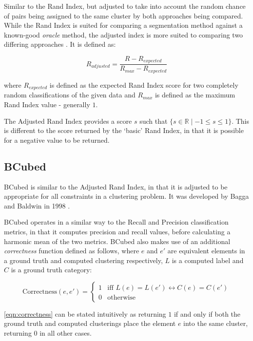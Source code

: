 \documentclass{uvamscse}	%
\begin{document}
Similar to the Rand Index, but adjusted to take into account the random chance of pairs being assigned to the same cluster by both approaches being compared. While the Rand Index is suited for comparing a segmentation method against a known-good \emph{oracle} method, the adjusted index is more suited to comparing two differing approaches \cite{Matteson2012}. It is defined as:
	
	\begin{equation}
	    R_{adjusted} = \frac{R - R_{expected}}{R_{max} - R_{expected}}
	\end{equation}
	
	where $R_{expected}$ is defined as the expected Rand Index score for two completely random classifications of the given data \cite{Matteson2012} and $R_{max}$ is defined as the maximum Rand Index value - generally $1$.
	
	The Adjusted Rand Index provides a score $s$ such that $ \{s\in\mathbb{R} \mid -1\leq s \leq 1\} $. This is different to the score returned by the `basic' Rand Index, in that it is possible for a negative value to be returned.
		
\subsection{BCubed}
		
BCubed is similar to the Adjusted Rand Index, in that it is adjusted to be appropriate for all constraints in a clustering problem. It was developed by Bagga and Baldwin in 1998 \cite{Bagga1998}.
	
	BCubed operates in a similar way to the Recall and Precision classification metrics, in that it computes precision and recall values, before calculating a harmonic mean of the two metrics. BCubed also makes use of an additional \emph{correctness} function defined as follows, where $e$ and $e'$ are equivalent elements in a ground truth and computed clustering respectively, $L$ is a computed label and $C$ is a ground truth category:
	
	\begin{equation}
	\label{eqn:correctness}
	    \text{Correctness}(e,e') = 
	    \begin{cases}
	        1 & \text{iff $L(e) = L(e') \leftrightarrow C(e) = C(e')$}\\
	        0 & \text{otherwise}
	    \end{cases}
	\end{equation}
	
	\autoref{eqn:correctness} can be stated intuitively as returning $1$ if and only if both the ground truth and computed clusterings place the element $e$ into the same cluster, returning $0$ in all other cases.
	
\end{document}
